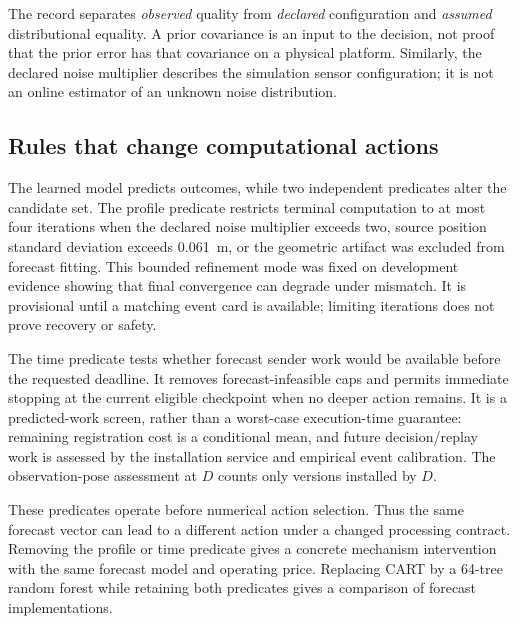 The record separates \emph{observed} quality from \emph{declared} configuration and \emph{assumed} distributional equality. A prior covariance is an input to the decision, not proof that the prior error has that covariance on a physical platform. Similarly, the declared noise multiplier describes the simulation sensor configuration; it is not an online estimator of an unknown noise distribution.

\subsection{Rules that change computational actions}
The learned model predicts outcomes, while two independent predicates alter the candidate set. The profile predicate restricts terminal computation to at most four iterations when the declared noise multiplier exceeds two, source position standard deviation exceeds 0.061~m, or the geometric artifact was excluded from forecast fitting. This bounded refinement mode was fixed on development evidence showing that final convergence can degrade under mismatch. It is provisional until a matching event card is available; limiting iterations does not prove recovery or safety.

The time predicate tests whether forecast sender work would be available before the requested deadline. It removes forecast-infeasible caps and permits immediate stopping at the current eligible checkpoint when no deeper action remains. It is a predicted-work screen, rather than a worst-case execution-time guarantee: remaining registration cost is a conditional mean, and future decision/replay work is assessed by the installation service and empirical event calibration. The observation-pose assessment at $D$ counts only versions installed by $D$.

These predicates operate before numerical action selection. Thus the same forecast vector can lead to a different action under a changed processing contract. Removing the profile or time predicate gives a concrete mechanism intervention with the same forecast model and operating price. Replacing CART by a 64-tree random forest while retaining both predicates gives a comparison of forecast implementations.

